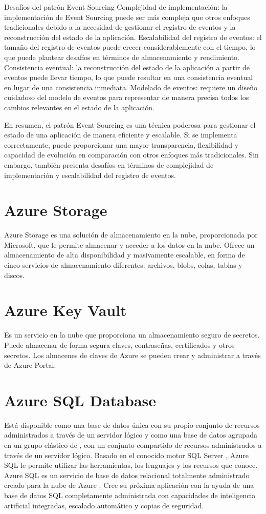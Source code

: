 Desafíos del patrón Event Sourcing
Complejidad de implementación: la implementación de Event Sourcing puede ser más compleja que otros enfoques tradicionales debido a la necesidad de gestionar el registro de eventos y la reconstrucción del estado de la aplicación.
Escalabilidad del registro de eventos: el tamaño del registro de eventos puede crecer considerablemente con el tiempo, lo que puede plantear desafíos en términos de almacenamiento y rendimiento.
Consistencia eventual: la reconstrucción del estado de la aplicación a partir de eventos puede llevar tiempo, lo que puede resultar en una consistencia eventual en lugar de una consistencia inmediata.
Modelado de eventos: requiere un diseño cuidadoso del modelo de eventos para representar de manera precisa todos los cambios relevantes en el estado de la aplicación.

En resumen, el patrón Event Sourcing es una técnica poderosa para gestionar el estado de una aplicación de manera eficiente y escalable. Si se implementa correctamente, puede proporcionar una mayor transparencia, flexibilidad y capacidad de evolución en comparación con otros enfoques más tradicionales. Sin embargo, también presenta desafíos en términos de complejidad de implementación y escalabilidad del registro de eventos.
\section{Azure Storage}
Azure Storage es una solución de almacenamiento en la nube, proporcionada por Microsoft,
 que le permite almacenar y acceder a los datos en la nube. Ofrece un almacenamiento de alta
  disponibilidad y masivamente escalable, en forma de cinco servicios de almacenamiento diferentes: archivos, blobs, colas, tablas y discos.
\section{Azure Key Vault}
Es un servicio en la nube que proporciona un almacenamiento seguro de secretos. Puede almacenar de forma segura claves, contraseñas, certificados y otros secretos. Los almacenes de claves de Azure se pueden crear y administrar a través de Azure Portal.
\section{Azure  SQL Database}
Está disponible como una base de datos única con su propio conjunto de recursos administrados a través de un servidor lógico y como una base de datos agrupada en un grupo elástico de , con un conjunto compartido de recursos administrados a través de un servidor lógico.
Basado en el conocido motor SQL Server , Azure SQL le permite utilizar las herramientas, los lenguajes y los recursos que conoce.
Azure SQL es un servicio de base de datos relacional totalmente administrado creado para la nube de Azure . Cree su próxima aplicación con la ayuda de una base de datos SQL completamente administrada con capacidades de inteligencia artificial integradas, escalado automático y copias de seguridad.
